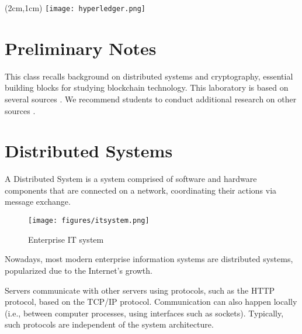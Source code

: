 \documentclass[12pt,a4paper]{article}
\begin{document}
\textblockorigin{-34pt}{-12pt}
\begin{textblock*}{10cm}(2cm,1cm)
\texttt{[image: hyperledger.png]}
\end{textblock*}

\section*{Preliminary Notes}
This class recalls background on distributed systems and cryptography, essential building blocks for studying blockchain technology. This laboratory is based on several sources \cite{dscd,sdist2017,Wong2014,Ousterhout_presentation,Verissimo2001,correia2019byzantine,raft_paper}. We recommend students to conduct additional research on other sources \cite{mit,princeton}.





\section{Distributed Systems}
\label{sec:ds}
A Distributed System is a system comprised of software and hardware components that are connected on a network, coordinating their actions via message exchange. 

\begin{figure}[h!]
    \centering
    \texttt{[image: figures/itsystem.png]}
    \caption{Enterprise IT system \cite{Wong2014}}
    \label{fig:internet}
\end{figure}

Nowadays, most modern enterprise information systems are distributed systems, popularized due to the Internet's growth.


Servers communicate with other servers using protocols, such as the HTTP protocol, based on the TCP/IP protocol. Communication can also happen locally (i.e., between computer processes, using interfaces such as sockets). Typically, such protocols are independent of the system architecture.
\end{document}
